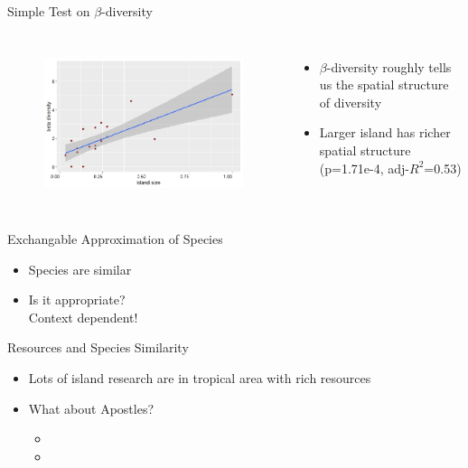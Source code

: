 \documentclass{beamer}
\begin{document}
\begin{frame}{Simple Test on $\beta$-diversity}
	\begin{columns}[c]
		\column{7cm}
		\begin{figure}[ht]
			\centering
			\includegraphics[scale=.5]{fig/APIS/beta_size.jpeg}
			\label{beta-size}
		\end{figure}
		
		\column{4cm}
		\begin{itemize}
			\item $\beta$-diversity roughly tells us the spatial structure of diversity
			\item Larger island has richer spatial structure (p=1.71e-4, adj-$R^{2}$=0.53)
		\end{itemize}
	\end{columns}
\end{frame}

\begin{frame}{Exchangable Approximation of Species}
\begin{itemize}
	\item Species are similar\pause
	\item Is it appropriate? \\Context dependent!
\end{itemize}
\end{frame}




\begin{frame}{Resources and Species Similarity}
	\begin{itemize}
		\item Lots of island research are in tropical area with rich resources
		\item What about Apostles?
		\begin{itemize}
			\item[]
			\item[] 
		\end{itemize}
	\end{itemize}
\end{frame}
\end{document}
